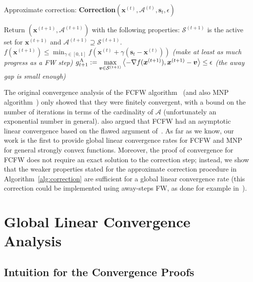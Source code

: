 \documentclass{article} %
\newcommand{\stepsize}{\gamma}
\newcommand{\away}{{\hspace{0.06em}\textnormal{\scriptsize A}}}
\newcommand{\x}{\bm{x}}
\newcommand{\s}{\bm{s}}
\newcommand{\vv}{\bm{v}} %
\newcommand{\Vertices}{\mathcal{A}} %
\newcommand{\Coreset}{\mathcal{S}}
\newcommand{\0}{\mathbf{0}} %
\begin{document}
%

\begin{algorithm}
	\caption{Approximate correction: \textbf{Correction}$(\x^{(t)}, \Vertices^{(t)}, \s_t, \epsilon)$}
	\label{alg:correction}
	\begin{algorithmic}[1]
	\STATE Return $(\x^{(t+1)},  \Vertices^{(t+1)})$ with the following properties:
	\STATE \quad $\Coreset^{(t+1)}$ is the active set for $\x^{(t+1)}$ and $ \Vertices^{(t+1)} \supseteq \Coreset^{(t+1)}$.
	\STATE \quad $f(\x^{(t+1)}) \leq \displaystyle\min_{\stepsize \in [0,1]} \textstyle f\left(\x^{(t)} + \stepsize (\s_t - \x^{(t)})\right)$ \qquad \emph{\small (make at least as much progress as a FW step)}
	\STATE \quad $g_{t+1}^\away := \displaystyle\max_{\vv \in \Coreset^{(t+1)} } \textstyle\left\langle -\nabla f(\x^{(t+1)}), \x^{(t+1)} - \vv \right\rangle \leq \epsilon$ \quad \emph{\small (the away gap is small enough)}
	\end{algorithmic}
\end{algorithm}

The original convergence analysis of the FCFW
algorithm~\citep{Holloway:1974:FCFW}  (and also MNP
algorithm~\citep{Wolfe:1976:MNP}) only showed that they were finitely
convergent, with a bound on the number of iterations in terms of the
cardinality of $\Vertices$ (unfortunately an exponential %
number in general). \citet{Holloway:1974:FCFW} also argued that FCFW had an
asymptotic linear convergence based on the flawed argument
of~\citet{Wolfe:1970wy}. As far as we know, our work is the first to provide
global linear convergence rates for FCFW and MNP for general strongly convex
functions. Moreover, the proof of convergence for FCFW does not require
an exact solution to the correction step; instead, we show that the weaker 
properties stated for the approximate correction procedure in Algorithm~\ref{alg:correction} 
are sufficient 
for a global linear convergence rate (this correction could be implemented
using away-steps FW, as done for example in~\cite{Krishnan:2015ws}).
\vspace{-2mm}
%
%
%
%
%
%
%
%


%
%
%
%
%
%
%

\section{Global Linear Convergence Analysis}\vspace{-2mm}

\subsection{Intuition for the Convergence Proofs}\vspace{-2mm}
\end{document}
